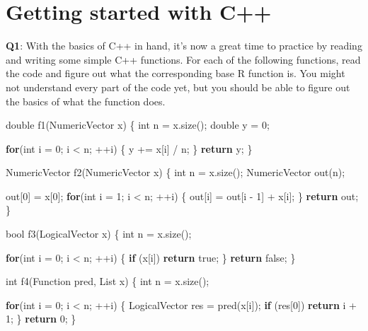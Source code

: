\documentclass[
]{krantz}
\makeatletter
\newenvironment{Shaded}{\begin{snugshade}}{\end{snugshade}}
\newcommand{\ControlFlowTok}[1]{\textcolor[rgb]{0.13,0.29,0.53}{\textbf{#1}}}
\newcommand{\DataTypeTok}[1]{\textcolor[rgb]{0.13,0.29,0.53}{#1}}
\newcommand{\DecValTok}[1]{\textcolor[rgb]{0.00,0.00,0.81}{#1}}
\newcommand{\KeywordTok}[1]{\textcolor[rgb]{0.13,0.29,0.53}{\textbf{#1}}}
\newcommand{\NormalTok}[1]{#1}
\newenvironment{kframe}{%
\medskip{}
\setlength{\fboxsep}{.8em}
 \def\at@end@of@kframe{}%
 \ifinner\ifhmode%
  \def\at@end@of@kframe{\end{minipage}}%
  \begin{minipage}{\columnwidth}%
 \fi\fi%
 \def\FrameCommand##1{\hskip\@totalleftmargin \hskip-\fboxsep
 \colorbox{shadecolor}{##1}\hskip-\fboxsep
     \hskip-\linewidth \hskip-\@totalleftmargin \hskip\columnwidth}%
 \MakeFramed {\advance\hsize-\width
   \@totalleftmargin\z@ \linewidth\hsize
   \@setminipage}}%
 {\par\unskip\endMakeFramed%
 \at@end@of@kframe}
\renewenvironment{Shaded}{\begin{kframe}}{\end{kframe}}
\renewcommand{\KeywordTok} [1]{\textcolor[rgb]{0.00,0.44,0.13}{{#1}}}
\renewcommand{\DataTypeTok}[1]{\textcolor[rgb]{0.56,0.13,0.00}{{#1}}}
\renewcommand{\DecValTok}  [1]{\textcolor[rgb]{0.25,0.63,0.44}{{#1}}}
\renewcommand{\NormalTok}  [1]{{#1}}
\makeatother
\begin{document}

\hypertarget{getting-started-with-c}{%
\section{Getting started with C++}\label{getting-started-with-c}}

\textbf{{Q1}}: With the basics of C++ in hand, it's now a great time to practice by reading and writing some simple C++ functions. For each of the following functions, read the code and figure out what the corresponding base R function is. You might not understand every part of the code yet, but you should be able to figure out the basics of what the function does.

\begin{Shaded}
\begin{Highlighting}[]
\DataTypeTok{double}\NormalTok{ f1(NumericVector x) \{}
  \DataTypeTok{int}\NormalTok{ n = x.size();}
  \DataTypeTok{double}\NormalTok{ y = }\DecValTok{0}\NormalTok{;}
  
  \ControlFlowTok{for}\NormalTok{(}\DataTypeTok{int}\NormalTok{ i = }\DecValTok{0}\NormalTok{; i < n; ++i) \{}
\NormalTok{    y += x[i] / n;}
\NormalTok{  \}}
  \ControlFlowTok{return}\NormalTok{ y;}
\NormalTok{\}}

\NormalTok{NumericVector f2(NumericVector x) \{}
  \DataTypeTok{int}\NormalTok{ n = x.size();}
\NormalTok{  NumericVector out(n);}
  
\NormalTok{  out[}\DecValTok{0}\NormalTok{] = x[}\DecValTok{0}\NormalTok{];}
  \ControlFlowTok{for}\NormalTok{(}\DataTypeTok{int}\NormalTok{ i = }\DecValTok{1}\NormalTok{; i < n; ++i) \{}
\NormalTok{    out[i] = out[i - }\DecValTok{1}\NormalTok{] + x[i];}
\NormalTok{  \}}
  \ControlFlowTok{return}\NormalTok{ out;}
\NormalTok{\}}

\DataTypeTok{bool}\NormalTok{ f3(LogicalVector x) \{}
  \DataTypeTok{int}\NormalTok{ n = x.size();}
  
  \ControlFlowTok{for}\NormalTok{(}\DataTypeTok{int}\NormalTok{ i = }\DecValTok{0}\NormalTok{; i < n; ++i) \{}
    \ControlFlowTok{if}\NormalTok{ (x[i]) }\ControlFlowTok{return} \KeywordTok{true}\NormalTok{;}
\NormalTok{  \}}
  \ControlFlowTok{return} \KeywordTok{false}\NormalTok{;}
\NormalTok{\}}

\DataTypeTok{int}\NormalTok{ f4(Function pred, List x) \{}
  \DataTypeTok{int}\NormalTok{ n = x.size();}
  
  \ControlFlowTok{for}\NormalTok{(}\DataTypeTok{int}\NormalTok{ i = }\DecValTok{0}\NormalTok{; i < n; ++i) \{}
\NormalTok{    LogicalVector res = pred(x[i]);}
    \ControlFlowTok{if}\NormalTok{ (res[}\DecValTok{0}\NormalTok{]) }\ControlFlowTok{return}\NormalTok{ i + }\DecValTok{1}\NormalTok{;}
\NormalTok{  \}}
  \ControlFlowTok{return} \DecValTok{0}\NormalTok{;}
\NormalTok{\}}


\end{Highlighting}
\end{Shaded}
\end{document}
